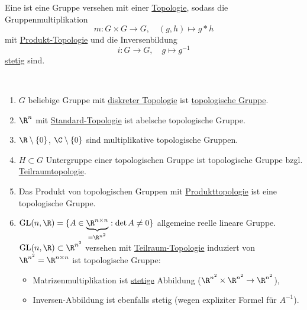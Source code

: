 \begin{remark}\label{exkurs:topologischeGruppe}
  Eine  ist eine Gruppe versehen mit einer \hyperref[def:topologie]{Topologie}, sodass die Gruppenmultiplikation
  \begin{equation*}
    m: G \times G \to G, \quad (g,h) \mapsto g*h
  \end{equation*}
  mit \hyperref[def:produkttopologie]{Produkt-Topologie} und die Inversenbildung
  \begin{equation*}
    i: G \to G, \quad g \mapsto g^{-1 }
  \end{equation*}
  \hyperref[def:stetig]{stetig} sind.
\end{remark}

\begin{example}
  \
  \begin{enumerate}
    \item \( G \) beliebige Gruppe mit \hyperref[bsp:diskreteTopologie]{diskreter Topologie} ist \hyperref[exkurs:topologischeGruppe]{topologische Gruppe}.
    \item \( \R^n \) mit \hyperref[bsp:standardtopologie]{Standard-Topologie} ist abelsche topologische Gruppe.
    \item \( \R \setminus \{ 0 \} \), \( \C \setminus \{ 0 \} \) sind multiplikative topologische Gruppen.
    \item \( H \subset G \) Untergruppe einer topologischen Gruppe ist topologische Gruppe bzgl. \hyperref[def:teilraumtopologie]{Teilraumtopologie}.
    \item Das Produkt von topologischen Gruppen mit \hyperref[def:produkttopologie]{Produkttopologie} ist eine topologische Gruppe.
    \item \( \text{GL}(n,\R) = \{ A \in \underbrace{\R^{n \times n}}_{= \R^{n^2}} : \det A \neq 0 \} \) allgemeine reelle lineare Gruppe. \\
      \( \text{GL}(n,\R) \subset \R^{n^2} \) versehen mit \hyperref[def:teilraumtopologie]{Teilraum-Topologie} induziert von \( \R^{n^2} = \R^{n \times n} \) ist topologische Gruppe:
      \begin{itemize}
        \item Matrizenmultiplikation ist \hyperref[def:stetig]{stetige} Abbildung (\( \R^{n^2} \times \R^{n^2} \to \R^{n^2} \)),
        \item Inversen-Abbildung ist ebenfalls stetig (wegen expliziter Formel für \( A^{-1} \)).
      \end{itemize}

\end{enumerate}
\end{example}
